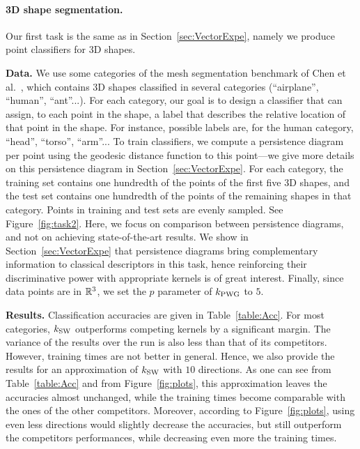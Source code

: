 \paragraph*{3D shape segmentation.}
Our first task is the same as in Section~\ref{sec:VectorExpe}, namely we produce point classifiers for 3D shapes.

{\bf Data.}  We use some categories of the mesh segmentation benchmark of Chen et al.~\cite{Chen09},
which contains 3D shapes classified in several categories (``airplane'', ``human'', ``ant''...).
For each category, our goal is to design a classifier that can assign, to each point in the shape,
a label that describes the relative location of that point in the shape. For instance, possible labels are, for the human category, 
``head'', ``torso'', ``arm''...
To train classifiers, we compute a persistence diagram per point using the geodesic distance function 
to this point---we give more details on this persistence diagram in Section~\ref{sec:VectorExpe}.
For each category, the training set contains one hundredth of the points of the first five 3D shapes,
and the test set contains one hundredth of the points of the remaining shapes in that category. Points in
training and test sets are evenly sampled. See Figure~\ref{fig:task2}.
Here, we focus on comparison between persistence diagrams, and not
on achieving state-of-the-art results. We show in Section~\ref{sec:VectorExpe} that 
persistence diagrams bring complementary information
to classical descriptors in this task, hence reinforcing their discriminative power with appropriate kernels is of great interest.
Finally, since data points are in $\mathbb{R}^3$, we set the $p$ parameter of $k_{\rm PWG}$ to $5$. 

{\bf Results.} Classification accuracies are given in Table~\ref{table:Acc}.
For most categories, $k_{\rm SW}$ outperforms competing kernels by a significant margin.
The variance of the results over the run is also less than that of its competitors. 
However, training times are not better in general. 
Hence, we also provide the results for an approximation of $k_{\rm SW}$ with $10$ directions.
As one can see from Table~\ref{table:Acc} and from Figure~\ref{fig:plots}, this approximation leaves the accuracies almost unchanged, 
while the training times become comparable with the ones of the other competitors. Moreover, 
according to Figure~\ref{fig:plots}, using even less directions
would slightly decrease the accuracies, but still outperform the competitors performances,
while decreasing even more the training times. 


